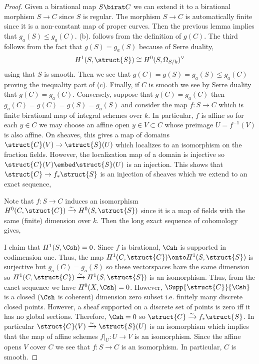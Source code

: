 \begin{proof}
Given a birational map $S \birat C$ we can extend it to a birational morphism $S \to C$ since $S$ is regular. The morphism $S \to C$ is automatically finite since it is a non-constant map of proper curves. Then the previous lemma implies that $g_a(S) \le g_a(C)$. (b). follows from the definition of $g(C)$. The third follows from the fact that $g(S) = g_a(S)$  because of Serre duality, 
\[ H^1(S, \struct{S}) \cong H^0(S, \Omega_{S / k})^\vee \]
using that $S$ is smooth. Then we see that $g(C) = g(S) = g_a(S) \le g_a(C)$ proving the inequality part of (c). Finally, if $C$ is smooth we see by Serre duality that $g(C) = g_a(C)$. Conversely, suppose that $g(C) = g_a(C)$ then $g_a(C) = g(C) = g(S) = g_a(S)$ and consider the map $f : S \to C$ which is finite birational map of integral schemes over $k$. In particular, $f$ is affine so for each $y \in C$ we may choose an affine open $y \in V \subset C$ whose preimage $U = f^{-1}(V)$ is also affine. On sheaves, this gives a map of domains $\struct{C}(V) \to \struct{S}(U)$ which localizes to an isomorphism on the fraction fields. However, the localization map of a domain is injective so $\struct{C}(V) \embed \struct{S}(U)$ is an injection. This shows that $\struct{C} \to f_* \struct{S}$ is an injection of sheaves which we extend to an exact sequence,
\begin{center}
\end{center} 
Note that $f : S \to C$ induces an isomorphism $H^0(C, \struct{C}) \xrightarrow{\sim} H^0(S, \struct{S})$ since it is a map of fields with the same (finite) dimension over $k$. Then the long exact sequence of cohomology gives,
\begin{center}
\end{center}
I claim that $H^1(S, \Csh) = 0$. Since $f$ is birational, $\Csh$ is supported in codimension one. Thus, the map $H^1(C, \struct{C}) \onto H^1(S, \struct{S})$ is surjective but $g_a(C) = g_a(S)$ so these vectorspaces have the same dimension so $H^1(C, \struct{C}) \xrightarrow{\sim} H^1(S, \struct{S})$ is an isomorphism. Thus, from the exact sequence we have $H^0(X, \Csh) = 0$. However, $\Supp{\struct{C}}{\Csh}$ is a closed ($\Csh$ is coherent) dimension zero subset i.e. finitely many discrete closed points. However, a sheaf supported on a discrete set of points is zero iff it has no global sections. Therefore, $\Csh = 0$ so $\struct{C} \xrightarrow{\sim} f_* \struct{S}$. In particular $\struct{C}(V) \xrightarrow{\sim} \struct{S}(U)$ is an isomorphism which implies that the map of affine schemes $f|_U : U \to V$ is an isomorphism. Since the affine opens $V$ cover $C$ we see that $f : S \to C$ is an isomorphism. In particular, $C$ is smooth. 
\end{proof}


